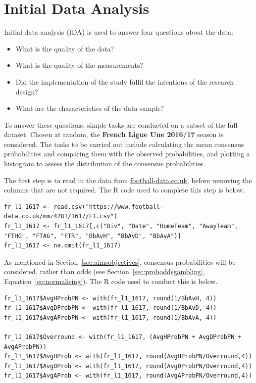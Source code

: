 \documentclass[a4paper,10pt]{report}
\begin{document}
\section{Initial Data Analysis} \label{sec:eliteida}
Initial data analysis (IDA) is used to answer four questions about the data:
\begin{itemize}
	\item What is the quality of the data?
	\item What is the quality of the measurements?
	\item Did the implementation of the study fulfil the intentions of the research design?
	\item What are the characteristics of the data sample? \autocite{Ader08}
\end{itemize}
To answer these questions, simple tasks are conducted on a subset of the full dataset. Chosen at random, the \textbf{French Ligue Une 2016/17} season is considered. The tasks to be carried out include calculating the mean consensus probabilities and comparing them with the observed probabilities, and plotting a histogram to assess the distribution of the consensus probabilities.

The first step is to read in the data from \url{football-data.co.uk}, before removing the columns that are not required. The R code used to complete this step is below.
\begin{lstlisting}
fr_l1_1617 <- read.csv("https://www.football-data.co.uk/mmz4281/1617/F1.csv")
fr_l1_1617 <- fr_l1_1617[,c("Div", "Date", "HomeTeam", "AwayTeam", "FTHG", "FTAG", "FTR", "BbAvH", "BbAvD", "BbAvA")]
fr_l1_1617 <- na.omit(fr_l1_1617)
\end{lstlisting}

As mentioned in Section~\ref{sec:aimsobjectives}, consensus probabilities will be considered, rather than odds (see Section~\ref{sec:proboddsgambling}, Equation~\ref{eq:normalising}). The R code used to conduct this is below.

\begin{lstlisting}
fr_l1_1617$AvgHProbPN <- with(fr_l1_1617, round(1/BbAvH, 4))
fr_l1_1617$AvgDProbPN <- with(fr_l1_1617, round(1/BbAvD, 4))
fr_l1_1617$AvgAProbPN <- with(fr_l1_1617, round(1/BbAvA, 4))

fr_l1_1617$Overround <- with(fr_l1_1617, (AvgHProbPN + AvgDProbPN + AvgAProbPN))
fr_l1_1617$AvgHProb <- with(fr_l1_1617, round(AvgHProbPN/Overround,4))
fr_l1_1617$AvgDProb <- with(fr_l1_1617, round(AvgDProbPN/Overround,4))
fr_l1_1617$AvgAProb <- with(fr_l1_1617, round(AvgAProbPN/Overround,4))

\end{lstlisting}
\end{document}
